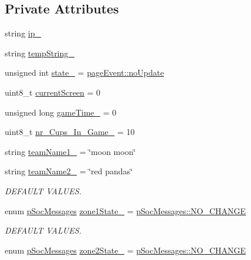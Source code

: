 \subsection*{Private Attributes}
\begin{DoxyCompactItemize}
\item 
string \hyperlink{class_score_system_crtl_a5759191f17d2b510527f6779829c60e6}{ip\+\_\+}
\item 
string \hyperlink{class_score_system_crtl_ac7dd279813c25cbbd8ac14a3f3f5e35a}{temp\+String\+\_\+}
\item 
unsigned int \hyperlink{class_score_system_crtl_a347375cfd504730d6c12b193cc34e274}{state\+\_\+} = \hyperlink{_page_8hpp_ab0a8bc3c34e6c808c389332ea2654365a9f75a1925ae97b13f3a84cc493f671dd}{page\+Event\+::no\+Update}
\item 
uint8\+\_\+t \hyperlink{class_score_system_crtl_ad10e10dbe95e3b8afd47c6eaaf59c5f0}{current\+Screen} = 0
\item 
unsigned long \hyperlink{class_score_system_crtl_aec703fee0bce24cb0c5b6b46ce6260b9}{game\+Time\+\_\+} = 0
\item 
uint8\+\_\+t \hyperlink{class_score_system_crtl_a6828b899dd4351499125ea996d994b37}{nr\+\_\+\+Cups\+\_\+\+In\+\_\+\+Game\+\_\+} = 10
\item 
string \hyperlink{class_score_system_crtl_aebddfa81ba4ebb47200d60e46fd9adcb}{team\+Name1\+\_\+} = \char`\"{}moon moon\char`\"{}
\item 
string \hyperlink{class_score_system_crtl_a7942072f35a6905f8c6d6cc480153725}{team\+Name2\+\_\+} = \char`\"{}red pandas\char`\"{}
\begin{DoxyCompactList}\small\item\em D\+E\+F\+A\+U\+LT V\+A\+L\+U\+ES. \end{DoxyCompactList}\item 
enum \hyperlink{_score_system_crtl_8hpp_a5561f3e128877a8ec1313455605a2c92}{p\+Soc\+Messages} \hyperlink{class_score_system_crtl_a3be2ff5efa739ea09d8aa1bdcd43a7c2}{zone1\+State\+\_\+} = \hyperlink{_score_system_crtl_8hpp_a5561f3e128877a8ec1313455605a2c92a7fb0c1cca10ff57ae7aa3878ba530fbd}{p\+Soc\+Messages\+::\+N\+O\+\_\+\+C\+H\+A\+N\+GE}
\begin{DoxyCompactList}\small\item\em D\+E\+F\+A\+U\+LT V\+A\+L\+U\+ES. \end{DoxyCompactList}\item 
enum \hyperlink{_score_system_crtl_8hpp_a5561f3e128877a8ec1313455605a2c92}{p\+Soc\+Messages} \hyperlink{class_score_system_crtl_ae5b46cd4c92c500e63ca0341b6ce2a11}{zone2\+State\+\_\+} = \hyperlink{_score_system_crtl_8hpp_a5561f3e128877a8ec1313455605a2c92a7fb0c1cca10ff57ae7aa3878ba530fbd}{p\+Soc\+Messages\+::\+N\+O\+\_\+\+C\+H\+A\+N\+GE}

\end{DoxyCompactItemize}
